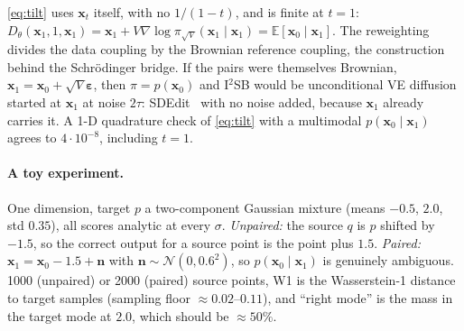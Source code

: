 \documentclass[11pt]{article}
\theoremstyle{definition}
\theoremstyle{remark}
\newcommand{\x}{\bm{x}}
\newcommand{\eps}{\bm{\varepsilon}}
\newcommand{\nn}{\bm{n}}
\newcommand{\E}{\mathbb{E}}
\newcommand{\N}{\mathcal{N}}
\newcommand{\D}{D_\theta}
\newcommand{\grad}{\nabla}
\begin{document}
\eqref{eq:tilt} uses $\x_t$ itself, with no $1/(1-t)$, and is finite at $t=1$:
$\D(\x_1,1,\x_1) = \x_1 + V\grad\log\pi_{\sqrt V}(\x_1\mid\x_1) = \E[\x_0\mid\x_1]$. The
reweighting divides the data coupling by the Brownian reference coupling, the construction
behind the Schr\"odinger bridge. If the pairs were themselves Brownian,
$\x_1 = \x_0 + \sqrt V\eps$, then $\pi = p(\x_0)$ and I$^2$SB would be unconditional VE
diffusion started at $\x_1$ at noise $2\tau$: SDEdit~\cite{meng2022} with no noise added,
because $\x_1$ already carries it. A 1-D quadrature check of \eqref{eq:tilt} with a multimodal
$p(\x_0\mid\x_1)$ agrees to $4\cdot10^{-8}$, including $t=1$.

\paragraph{A toy experiment.} One dimension, target $p$ a two-component Gaussian mixture
(means $-0.5$, $2.0$, std $0.35$), all scores analytic at every $\sigma$. \emph{Unpaired:}
the source $q$ is $p$ shifted by $-1.5$, so the correct output for a source point is the point
plus $1.5$. \emph{Paired:} $\x_1 = \x_0 - 1.5 + \nn$ with $\nn\sim\N(0,0.6^2)$, so
$p(\x_0\mid\x_1)$ is genuinely ambiguous. 1000 (unpaired) or 2000 (paired) source points,
W1 is the Wasserstein-1 distance to target samples (sampling floor $\approx0.02$--$0.11$), and
``right mode'' is the mass in the target mode at $2.0$, which should be $\approx50\%$.
\end{document}
